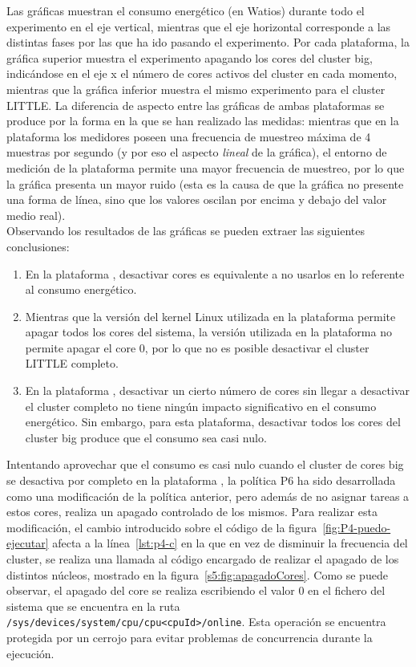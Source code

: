 Las gráficas muestran el consumo energético (en Watios) durante todo el
experimento en el eje vertical, mientras que el eje horizontal corresponde
a las distintas fases por las que ha ido pasando el experimento. Por cada
plataforma, la gráfica superior muestra el experimento apagando los cores
del cluster big, indicándose en el eje x el número de cores activos del
cluster en cada momento, mientras que la gráfica inferior muestra el mismo
experimento para el cluster LITTLE. La diferencia de aspecto entre las
gráficas de ambas plataformas se produce por la forma en la que se han
realizado las medidas: mientras que en la plataforma \odroid los medidores
poseen una frecuencia de muestreo máxima de 4 muestras por segundo (y por
eso el aspecto \emph{lineal} de la gráfica), el entorno de medición de la
plataforma \juno permite una mayor frecuencia de muestreo, por lo que la
gráfica presenta un mayor ruido (esta es la causa de que la gráfica no
presente una forma de línea, sino que los valores oscilan por encima y
debajo del valor medio real).\\
Observando los resultados de las gráficas se pueden extraer las siguientes
conclusiones:

\begin{enumerate}
\item En la plataforma \juno, desactivar cores es equivalente a no usarlos
  en lo referente al consumo energético.
\item Mientras que la versión del kernel Linux utilizada en la plataforma
  \juno permite apagar todos los cores del sistema, la versión utilizada en
  la plataforma \odroid no permite apagar el core 0, por lo que no es
  posible desactivar el cluster LITTLE completo.
\item En la plataforma \odroid, desactivar un cierto número de cores sin
  llegar a desactivar el cluster completo no tiene ningún impacto
  significativo en el consumo energético. Sin embargo, para esta
  plataforma, desactivar todos los cores del cluster big produce que el
  consumo sea casi nulo.
\end{enumerate}


Intentando aprovechar que el consumo es casi nulo cuando el cluster de
cores big se desactiva por completo en la plataforma \odroid, la política
P6 ha sido desarrollada como una modificación de la política anterior, pero
además de no asignar tareas a estos cores, realiza un apagado controlado de
los mismos. Para realizar esta modificación, el cambio introducido sobre el
código de la figura~\ref{fig:P4-puedo-ejecutar} afecta a la
línea~\ref{lst:p4-c} en la que en vez de disminuir la frecuencia del
cluster, se realiza una llamada al código encargado de realizar el apagado
de los distintos núcleos, mostrado en la
figura~\ref{s5:fig:apagadoCores}. Como se puede observar, el apagado del
core se realiza escribiendo el valor 0 en el fichero del sistema que se
encuentra en la ruta
\texttt{/sys/devices/system/cpu/cpu<cpuId>/online}. Esta operación se
encuentra protegida por un cerrojo para evitar problemas de concurrencia
durante la ejecución.



